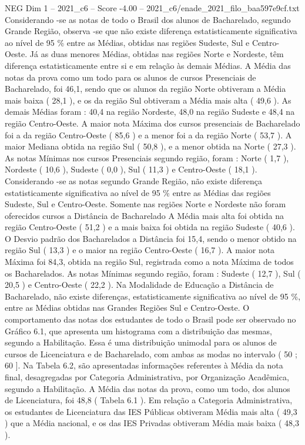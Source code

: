 \begin{textsample}{NEG Dim 1 – 2021\_c6 – Score -4.00 – 2021\_c6/enade\_2021\_filo\_baa597e9cf.txt}
Considerando -se as notas de todo o Brasil dos alunos de Bacharelado, segundo Grande Região, observa -se que não existe diferença estatisticamente significativa ao nível de 95 \% entre as Médias, obtidas nas regiões Sudeste, Sul e Centro-Oeste.
Já as duas menores Médias, obtidas nas regiões Norte e Nordeste, têm diferença estatisticamente entre si e em relação às demais Médias.
A Média das notas da prova como um todo para os alunos de cursos Presenciais de Bacharelado, foi 46,1, sendo que os alunos da região Norte obtiveram a Média mais baixa ( 28,1 ), e os da região Sul obtiveram a Média mais alta ( 49,6 ).
As demais Médias foram : 40,4 na região Nordeste, 48,0 na região Sudeste e 48,4 na região Centro-Oeste.
A maior nota Máxima dos cursos presenciais de Bacharelado foi a da região Centro-Oeste ( 85,6 ) e a menor foi a da região Norte ( 53,7 ).
A maior Mediana obtida na região Sul ( 50,8 ), e a menor obtida na Norte ( 27,3 ).
As notas Mínimas nos cursos Presenciais segundo região, foram : Norte ( 1,7 ), Nordeste ( 10,6 ), Sudeste ( 0,0 ), Sul ( 11,3 ) e Centro-Oeste ( 18,1 ).
Considerando -se as notas segundo Grande Região, não existe diferença estatisticamente significativa ao nível de 95 \% entre as Médias das regiões Sudeste, Sul e Centro-Oeste.
Somente nas regiões Norte e Nordeste não foram oferecidos cursos a Distância de Bacharelado A Média mais alta foi obtida na região Centro-Oeste ( 51,2 ) e a mais baixa foi obtida na região Sudeste ( 40,6 ).
O Desvio padrão dos Bacharelados a Distância foi 15,4, sendo o menor obtido na região Sul ( 13,3 ) e o maior na região Centro-Oeste ( 16,7 ).
A maior nota Máxima foi 84,3, obtida na região Sul, registrada como a nota Máxima de todos os Bacharelados.
As notas Mínimas segundo região, foram : Sudeste ( 12,7 ), Sul ( 20,5 ) e Centro-Oeste ( 22,2 ).
Na Modalidade de Educação a Distância de Bacharelado, não existe diferenças, estatisticamente significativa ao nível de 95 \%, entre as Médias obtidas nas Grandes Regiões Sul e Centro-Oeste.
O comportamento das notas dos estudantes de todo o Brasil pode ser observado no Gráfico 6.1, que apresenta um histograma com a distribuição das mesmas, segundo a Habilitação.
Essa é uma distribuição unimodal para os alunos de cursos de Licenciatura e de Bacharelado, com ambas as modas no intervalo ( 50 ; 60 ].
Na Tabela 6.2, são apresentadas informações referentes à Média da nota final, desagregadas por Categoria Administrativa, por Organização Acadêmica, segundo a Habilitação.
A Média das notas da prova, como um todo, dos alunos de Licenciatura, foi 48,8 ( Tabela 6.1 ).
Em relação a Categoria Administrativa, os estudantes de Licenciatura das IES Públicas obtiveram Média mais alta ( 49,3 ) que a Média nacional, e os das IES Privadas obtiveram Média mais baixa ( 48,3 ).

\end{textsample}
